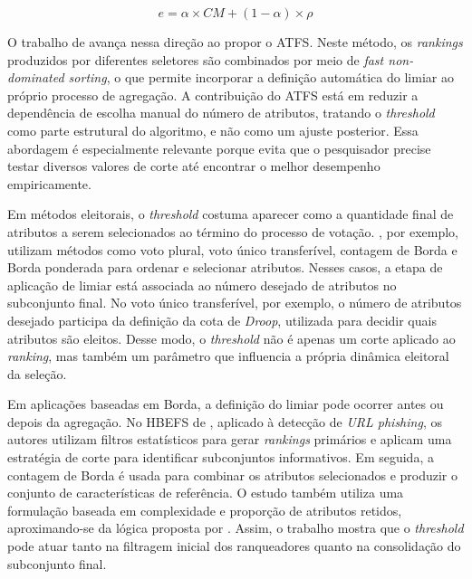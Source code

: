 \begin{equation}\label{eq:threshold_complexidade}
e = \alpha \times CM + (1-\alpha) \times \rho
\end{equation}

O trabalho de  avança nessa direção ao propor o ATFS. Neste método, os \textit{rankings} produzidos por diferentes seletores são combinados por meio de \textit{fast non-dominated sorting}, o que permite incorporar a definição automática do limiar ao próprio processo de agregação. A contribuição do ATFS está em reduzir a dependência de escolha manual do número de atributos, tratando o \textit{threshold} como parte estrutural do algoritmo, e não como um ajuste posterior. Essa abordagem é especialmente relevante porque evita que o pesquisador precise testar diversos valores de corte até encontrar o melhor desempenho empiricamente.

Em métodos eleitorais, o \textit{threshold} costuma aparecer como a quantidade final de atributos a serem selecionados ao término do processo de votação. , por exemplo, utilizam métodos como voto plural, voto único transferível, contagem de Borda e Borda ponderada para ordenar e selecionar atributos. Nesses casos, a etapa de aplicação de limiar está associada ao número desejado de atributos no subconjunto final. No voto único transferível, por exemplo, o número de atributos desejado participa da definição da cota de \textit{Droop}, utilizada para decidir quais atributos são eleitos. Desse modo, o \textit{threshold} não é apenas um corte aplicado ao \textit{ranking}, mas também um parâmetro que influencia a própria dinâmica eleitoral da seleção.

Em aplicações baseadas em Borda, a definição do limiar pode ocorrer antes ou depois da agregação. No HBEFS de , aplicado à detecção de \textit{URL phishing}, os autores utilizam filtros estatísticos para gerar \textit{rankings} primários e aplicam uma estratégia de corte para identificar subconjuntos informativos. Em seguida, a contagem de Borda é usada para combinar os atributos selecionados e produzir o conjunto de características de referência. O estudo também utiliza uma formulação baseada em complexidade e proporção de atributos retidos, aproximando-se da lógica proposta por . Assim, o trabalho mostra que o \textit{threshold} pode atuar tanto na filtragem inicial dos ranqueadores quanto na consolidação do subconjunto final.

